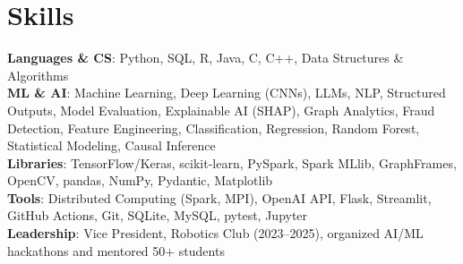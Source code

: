 \documentclass[letterpaper,11pt]{article}
\begin{document}
\section{Skills}
 \begin{itemize}[leftmargin=0.15in, label={}]
    \small{\item{
     \textbf{Languages \& CS}{: Python, SQL, R, Java, C, C++, Data Structures \& Algorithms} \\
     \textbf{ML \& AI}{: Machine Learning, Deep Learning (CNNs), LLMs, NLP, Structured Outputs, Model Evaluation, Explainable AI (SHAP), Graph Analytics, Fraud Detection, Feature Engineering, Classification, Regression, Random Forest, Statistical Modeling, Causal Inference} \\
     \textbf{Libraries}{: TensorFlow/Keras, scikit-learn, PySpark, Spark MLlib, GraphFrames, OpenCV, pandas, NumPy, Pydantic, Matplotlib} \\
     \textbf{Tools}{: Distributed Computing (Spark, MPI), OpenAI API, Flask, Streamlit, GitHub Actions, Git, SQLite, MySQL, pytest, Jupyter} \\
     \textbf{Leadership}{: Vice President, Robotics Club (2023--2025), organized AI/ML hackathons and mentored 50+ students}
    }}
 \end{itemize}
\end{document}
